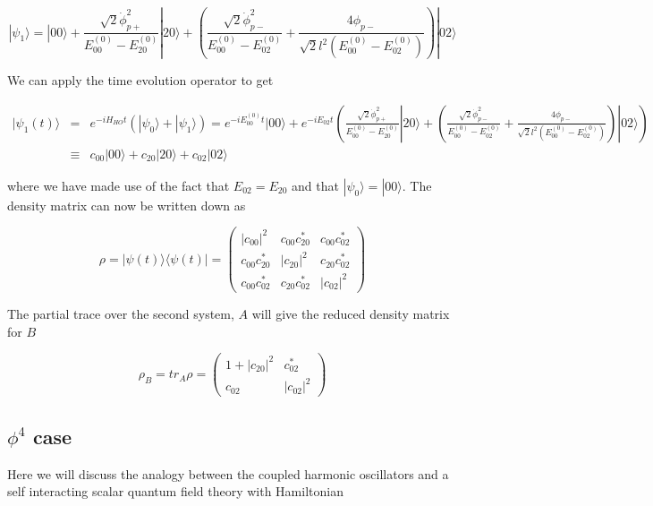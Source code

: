 \documentclass[aps,showpacs,onecolumn,floats,prd,superscriptaddress,nofootinbib]{revtex4-1}
\begin{document}
\begin{equation}
	|\psi_1 \rangle = |00 \rangle + \frac{\sqrt{2} \dot{\phi}^2_{p+}}{E^{(0)}_{00} - E^{(0)}_{20}} |20 \rangle + \left( \frac{\sqrt{2} \dot{\phi}^2_{p-}}{E^{(0)}_{00} - E^{(0)}_{02}} + \frac{4 \phi_{p-}}{\sqrt{2} l^2(E^{(0)}_{00} - E^{(0)}_{02})} \right) | 02 \rangle
\end{equation}

We can apply the time evolution operator to get

\begin{eqnarray}
	|\psi_1(t) \rangle & = & e^{-iH_{HO}t}(|\psi_0 \rangle + | \psi_1 \rangle) = e^{-iE_{00}^{(0)}t} |00 \rangle + e^{-iE_{02}t} \left( \frac{\sqrt{2} \dot{\phi}^2_{p+}}{E^{(0)}_{00} - E^{(0)}_{20}} |20 \rangle + \left( \frac{\sqrt{2} \dot{\phi}^2_{p-}}{E^{(0)}_{00} - E^{(0)}_{02}} + \frac{4 \phi_{p-}}{\sqrt{2} l^2(E^{(0)}_{00} - E^{(0)}_{02})} \right) | 02 \rangle \right)	\nonumber	\\
	& \equiv & c_{00} | 00 \rangle + c_{20} |20 \rangle + c_{02} |02 \rangle
\end{eqnarray}
	
where we have made use of the fact that $E_{02} = E_{20}$ and that $|\psi_0 \rangle = |00\rangle$. The density matrix can now be written down as

\begin{equation}
	\rho = |\psi(t) \rangle \langle \psi(t)| = \begin{pmatrix} |c_{00}|^2 & c_{00} c^*_{20} & c_{00} c^*_{02} \\
	c_{00}c^*_{20} & |c_{20}|^2 & c_{20} c^*_{02} \\
	c_{00}c_{02}^* & c_{20} c^*_{02} & |c_{02}|^2 \end{pmatrix}
\end{equation}

The partial trace over the second system, $A$ will give the reduced density matrix for $B$

\begin{equation}
	\rho_B = tr_A \rho = \begin{pmatrix} 1 + |c_{20}|^2 & c^*_{02} \\ c_{02} & |c_{02}|^2 \end{pmatrix}
\end{equation}




\subsection{$\phi^4$ case}
Here we will discuss the analogy between the coupled harmonic oscillators and a self interacting scalar quantum field theory with Hamiltonian
\end{document}

